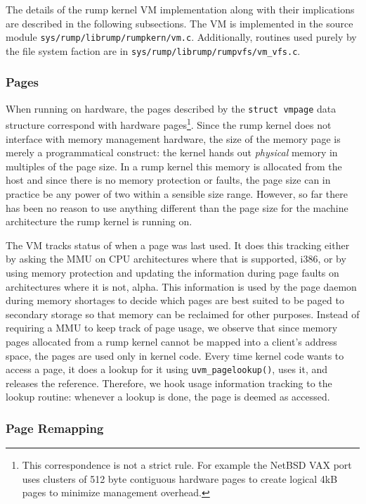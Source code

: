 The details of the rump kernel VM implementation along with their
implications are described in the following subsections.
The VM is implemented in the source module
\verb+sys/rump/librump/rumpkern/vm.c+.  Additionally, routines used
purely by the file system faction are in
\verb+sys/rump/librump/rumpvfs/vm_vfs.c+.

\subsubsection*{Pages}

When running on hardware, the pages described by the \texttt{struct
vmpage} data structure correspond with hardware pages\footnote{
	This correspondence is not a strict rule.  For example the NetBSD VAX port
	uses clusters of 512 byte contiguous hardware pages to
	create logical 4kB pages to minimize management
	overhead.
}.
Since the rump kernel does not interface with  memory management
hardware, the size of the memory page is merely a programmatical
construct: the kernel hands out \textit{physical} memory in multiples
of the page size.  In a rump kernel this memory is allocated from
the host and since there is no memory
protection or faults, the page size can in practice be any power
of two within a sensible size range.  However, so far there has
been no reason to use anything different than the page size for
the machine architecture the rump kernel is running on.

The VM tracks status of when a page was last used.  It does this tracking
either by asking the MMU on CPU architectures where that is supported,
\eg i386,
or by using memory protection and updating the information during
page faults on architectures where it is not, \eg alpha.  This information is
used by the page daemon during memory shortages to decide which
pages are best suited to be paged to secondary storage so that
memory can be reclaimed for other purposes.  Instead of requiring
a MMU to keep track of page usage, we observe that since memory
pages allocated from a rump kernel cannot be mapped into a client's
address space, the pages are used only in kernel code.  Every time
kernel code wants to access a page, it does a lookup for it using
\verb+uvm_pagelookup()+, uses it, and releases the reference.
Therefore, we hook usage information tracking to the lookup routine:
whenever a lookup is done, the page is deemed as accessed.

\subsubsection{Page Remapping}

